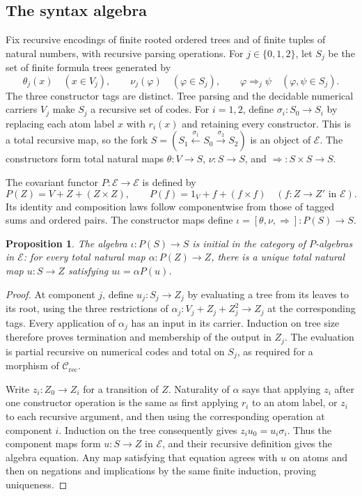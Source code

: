 \documentclass[11pt]{article}
\newtheorem{proposition}[theorem]{Proposition}
\begin{document}
\subsection{The syntax algebra}

Fix recursive encodings of finite rooted ordered trees and of finite
tuples of natural numbers, with recursive parsing operations. For
$j\in\{0,1,2\}$, let $S_j$ be the set of finite formula trees
generated by
\[
 \theta_j(x)\quad(x\in V_j),\qquad
 \nu_j(\varphi)\quad(\varphi\in S_j),\qquad
 \varphi\Rightarrow_j\psi\quad(\varphi,\psi\in S_j).
\]
The three constructor tags are distinct. Tree parsing and the
decidable numerical carriers $V_j$ make $S_j$ a recursive set of
codes. For $i=1,2$, define $\sigma_i:S_0\to S_i$ by replacing
each atom label $x$ with $r_i(x)$ and retaining every constructor.
This is a total recursive map, so the fork
$S=(S_1\xleftarrow{\sigma_1}S_0\xrightarrow{\sigma_2}S_2)$
is an object of $\mathcal E$. The constructors form total natural
maps $\theta:V\to S$, $\nu:S\to S$, and
$\Rightarrow:S\times S\to S$.

The covariant functor $P:\mathcal E\to\mathcal E$ is defined by
\[
 P(Z)=V+Z+(Z\times Z),\qquad
 P(f)=1_V+f+(f\times f)
 \quad(f:Z\to Z'\text{ in }\mathcal E).
\]
Its identity and composition laws follow componentwise from those
of tagged sums and ordered pairs. The constructor maps define
$\iota=[\theta,\nu,\Rightarrow]:P(S)\to S$.

\begin{proposition}\label{prop:fork-syntax-initial}
The algebra $\iota:P(S)\to S$ is initial in the category of
$P$-algebras in $\mathcal E$: for every total natural map
$\alpha:P(Z)\to Z$, there is a unique total natural map
$u:S\to Z$ satisfying $u\iota=\alpha P(u)$.
\end{proposition}
\begin{proof}
At component $j$, define $u_j:S_j\to Z_j$ by evaluating a tree
from its leaves to its root, using the three restrictions of
$\alpha_j:V_j+Z_j+Z_j^2\to Z_j$ at the corresponding tags.
Every application of $\alpha_j$ has an input in its carrier.
Induction on tree size therefore proves termination and membership
of the output in $Z_j$. The evaluation is partial recursive on
numerical codes and total on $S_j$, as required for a morphism of
$\mathcal C_{\mathrm{rec}}$.

Write $z_i:Z_0\to Z_i$ for a transition of $Z$. Naturality of
$\alpha$ says that applying $z_i$ after one constructor operation
is the same as first applying $r_i$ to an atom label, or $z_i$
to each recursive argument, and then using the corresponding
operation at component $i$. Induction on the tree consequently
gives $z_i u_0=u_i\sigma_i$. Thus the component maps form
$u:S\to Z$ in $\mathcal E$, and their recursive definition gives
the algebra equation. Any map satisfying that equation agrees
with $u$ on atoms and then on negations and implications by the
same finite induction, proving uniqueness.
\end{proof}
\end{document}
